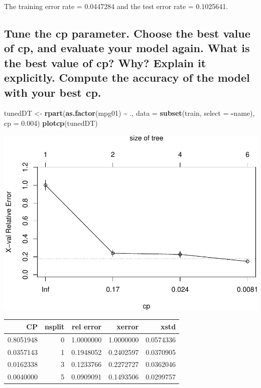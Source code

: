 \documentclass[
  12pt,
  oneside]{report}
\newenvironment{Shaded}{\begin{snugshade}}{\end{snugshade}}
\newcommand{\DataTypeTok}[1]{\textcolor[rgb]{0.13,0.29,0.53}{#1}}
\newcommand{\FloatTok}[1]{\textcolor[rgb]{0.00,0.00,0.81}{#1}}
\newcommand{\KeywordTok}[1]{\textcolor[rgb]{0.13,0.29,0.53}{\textbf{#1}}}
\newcommand{\NormalTok}[1]{#1}
\newcommand{\OperatorTok}[1]{\textcolor[rgb]{0.81,0.36,0.00}{\textbf{#1}}}
\newcommand{\StringTok}[1]{\textcolor[rgb]{0.31,0.60,0.02}{#1}}
\begin{document}
The training error rate = 0.0447284 and the test error rate = 0.1025641.

\hypertarget{tune-the-cp-parameter.-choose-the-best-value-of-cp-and-evaluate-your-model-again.-what-is-the-best-value-of-cp-why-explain-it-explicitly.-compute-the-accuracy-of-the-model-with-your-best-cp.}{%
\subsection{Tune the cp parameter. Choose the best value of cp, and evaluate your model again. What is the best value of cp? Why? Explain it explicitly. Compute the accuracy of the model with your best cp.}\label{tune-the-cp-parameter.-choose-the-best-value-of-cp-and-evaluate-your-model-again.-what-is-the-best-value-of-cp-why-explain-it-explicitly.-compute-the-accuracy-of-the-model-with-your-best-cp.}}

\begin{Shaded}
\begin{Highlighting}[]
\NormalTok{tunedDT \textless{}{-}}\StringTok{ }\KeywordTok{rpart}\NormalTok{(}\KeywordTok{as.factor}\NormalTok{(mpg01) }\OperatorTok{\textasciitilde{}}\StringTok{ }\NormalTok{., }\DataTypeTok{data =} \KeywordTok{subset}\NormalTok{(train, }\DataTypeTok{select =} \OperatorTok{{-}}\NormalTok{name), }
                 \DataTypeTok{cp =} \FloatTok{0.004}\NormalTok{)}
\KeywordTok{plotcp}\NormalTok{(tunedDT)}
\end{Highlighting}
\end{Shaded}

\includegraphics{leroy_francois_hw1_files/figure-latex/unnamed-chunk-15-1.pdf}

\begin{tabular}{r|r|r|r|r}
\hline
CP & nsplit & rel error & xerror & xstd\\
\hline
0.8051948 & 0 & 1.0000000 & 1.0000000 & 0.0574336\\
\hline
0.0357143 & 1 & 0.1948052 & 0.2402597 & 0.0370905\\
\hline
0.0162338 & 3 & 0.1233766 & 0.2272727 & 0.0362046\\
\hline
0.0040000 & 5 & 0.0909091 & 0.1493506 & 0.0299757\\
\hline
\end{tabular}
\end{document}
